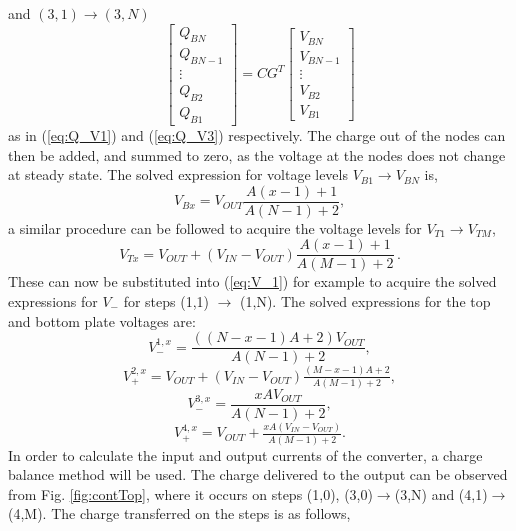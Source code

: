 \documentclass[conference]{IEEEtran}
\begin{document}
	and $(3,1)\rightarrow(3,N)$ 
	\begin{equation}
	\begin{bmatrix}
	Q_{BN} \\
	Q_{BN-1} \\
	\vdots\\
	Q_{B2} \\ 
	Q_{B1}
	\end{bmatrix}
	=
	C G^T
	\begin{bmatrix}
	V_{BN} \\
	V_{BN-1} \\
	\vdots \\
	V_{B2} \\
	V_{B1}
	\end{bmatrix}
	\label{eq:Q_V3}
	\end{equation}
	as in (\ref{eq:Q_V1}) and (\ref{eq:Q_V3}) respectively.
	The charge out of the nodes can then be added, and summed to zero, as the voltage at the nodes does not change at steady state. The solved expression for voltage levels $V_{B1} \rightarrow V_{BN}$ is,
	\begin{equation}
	V_{Bx} = V_{OUT}\frac{A(x-1) + 1}{A(N-1) + 2},
	\end{equation}
	a similar procedure can be followed to acquire the voltage levels for $V_{T1} \rightarrow V_{TM}$,
	\begin{equation}
	V_{Tx} = V_{OUT} + (V_{IN} - V_{OUT})\frac{A(x-1) + 1}{A(M-1) + 2}\,.
	\end{equation}
	These can now be substituted into (\ref{eq:V_1}) for example to acquire the solved expressions for $V_-$ for steps (1,1) $\rightarrow$ (1,N).
	The solved expressions for the top and bottom plate voltages are:
	\begin{equation}
	V_{-}^{1,x} = \frac{((N-x-1)A + 2)V_{OUT}}{A(N-1) + 2},
	\end{equation}
	\begin{equation}
	V_{+}^{2,x} = V_{OUT} + (V_{IN} -V_{OUT})\tfrac{(M-x-1)A + 2}{A(M-1) + 2},
	\end{equation}
	\begin{equation}
	V_{-}^{3,x} = \frac{xAV_{OUT}}{A(N-1) + 2},
	\end{equation}
	\begin{equation}
	V_{+}^{4,x} = V_{OUT} + \tfrac{xA(V_{IN} -V_{OUT})}{A(M-1) + 2}.
	\end{equation}
	In order to calculate the input and output currents of the converter, a charge balance method will be used. The charge delivered to the output can be observed from Fig. \ref{fig:contTop}, where it occurs on steps (1,0), (3,0)$\rightarrow$(3,N) and (4,1)$\rightarrow$(4,M). The charge transferred on the steps is as follows,
\end{document}
